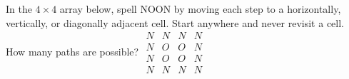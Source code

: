 In the $4\times4$ array below, spell NOON by moving each step to a horizontally, vertically, or diagonally adjacent cell. Start anywhere and never revisit a cell. How many paths are possible? $\begin{matrix}N&N&N&N\\N&O&O&N\\N&O&O&N\\N&N&N&N\end{matrix}$
